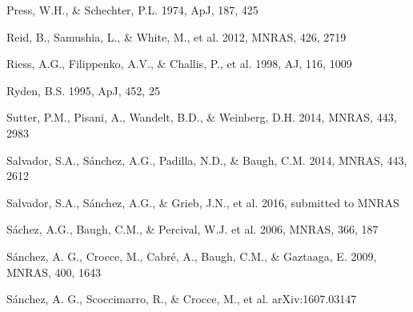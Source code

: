 \documentclass[iop]{emulateapj}
\begin{document}
\begin{thebibliography}{}
Press, W.H., \& Schechter, P.L. 1974, ApJ, 187, 425

Reid, B., Samushia, L., \& White, M., et al. 2012, MNRAS, 426, 2719  


Riess, A.G., Filippenko, A.V., \& Challis, P., et al. 1998, AJ, 116, 1009  




Ryden, B.S. 1995, ApJ, 452, 25  



Sutter, P.M., Pisani, A., Wandelt, B.D., \& Weinberg, D.H. 2014, MNRAS, 443, 2983

Salvador, S.A., S\'{a}nchez, A.G., Padilla, N.D., \& Baugh, C.M. 2014, MNRAS, 443, 2612

Salvador, S.A., S\'{a}nchez, A.G., \& Grieb, J.N., et al. 2016, submitted to MNRAS

S\'{a}chez, A.G., Baugh, C.M., \& Percival, W.J. et al. 2006, MNRAS, 366, 187

S\'{a}nchez, A. G., Crocce, M., Cabr\'{e}, A., Baugh, C.M., \& Gaztaaga, E. 2009, MNRAS, 400, 1643

S\'{a}nchez, A. G., Scoccimarro, R., \& Crocce, M., et al.
arXiv:1607.03147


\end{thebibliography}
\end{document}
